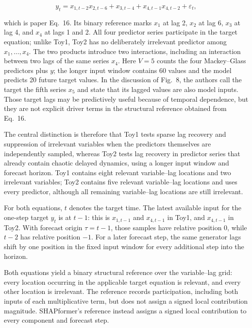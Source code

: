 \begin{equation}
    y_t
    = x_{1,t-2}x_{2,t-6}
    + x_{3,t-4}
    + x_{4,t-1}x_{4,t-2}
    + \varepsilon_t,
\end{equation}

which is paper Eq.~16. Its binary reference marks $x_1$ at lag 2, $x_2$ at
lag 6, $x_3$ at lag 4, and $x_4$ at lags 1 and 2. All four predictor series
participate in the target equation; unlike Toy1, Toy2 has no deliberately
irrelevant predictor among $x_1,\ldots,x_4$. The two products introduce two
interactions, including an interaction between two lags of the same series
$x_4$. Here $V=5$ counts the four Mackey--Glass predictors plus $y$; the longer
input window contains 60 values and the model predicts 20 future target values.
In the discussion of Fig.~8, the authors call the target the fifth series
$x_5$ and state that its lagged values are also model inputs. Those target lags
may be predictively useful because of temporal dependence, but they are not
explicit driver terms in the structural reference obtained from Eq.~16.

The central distinction is therefore that Toy1 tests sparse lag recovery and
suppression of irrelevant variables when the predictors themselves are
independently sampled, whereas Toy2 tests lag recovery in predictor series that
already contain chaotic delayed dynamics, using a longer input window and
forecast horizon. Toy1 contains eight relevant variable--lag locations and two
irrelevant variables; Toy2 contains five relevant variable--lag locations and
uses every predictor, although all remaining variable--lag locations are still
irrelevant.

For both equations, $t$ denotes the target time. The latest available input for
the one-step target $y_t$ is at $t-1$: this is $x_{1,t-1}$ and $x_{4,t-1}$ in
Toy1, and $x_{4,t-1}$ in Toy2. With forecast origin $\tau=t-1$, those samples
have relative position 0, while $t-2$ has relative position $-1$. For a later
forecast step, the same generator lags shift by one position in the fixed input
window for every additional step into the horizon.

Both equations yield a binary structural reference over the variable--lag
grid: every location occurring in the applicable target equation is relevant,
and every other location is irrelevant. The reference records participation,
including both inputs of each multiplicative term, but does not assign a signed
local contribution magnitude. SHAPformer's reference instead assigns a signed
local contribution to every component and forecast step.

